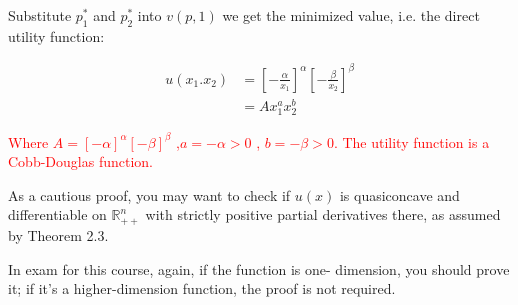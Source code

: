 \documentclass{article}
\newcommand{\R}{\mathbb{R}}
\begin{document}
Substitute $p^*_1$ and $p^*_2$ into $v(p,1)$ we get the minimized value, i.e. the direct utility function:

\begin{align*}
u(x_1.x_2) &= [-\frac{\alpha}{x_1}]^\alpha[-\frac{\beta}{x_2}]^\beta \\
 &= A x_1^a x_2^b
\end{align*}

\textcolor{red}{
Where $A = [-\alpha]^\alpha[-\beta]^\beta$ ,$a = -\alpha >0$ , $b= -\beta > 0$. The utility function is a Cobb-Douglas function.}

\begin{mdframed}[backgroundcolor=yellow!20,linecolor=white]
As a cautious proof, you may want to check if $u(x)$ is quasiconcave and differentiable on $\R^n_{++}$ with strictly positive partial derivatives there, as assumed by Theorem 2.3. 

In exam for this course, again, if the function is one- dimension, you should prove it; if it's a higher-dimension function, the proof is not required.
\end{mdframed}
\end{document}
